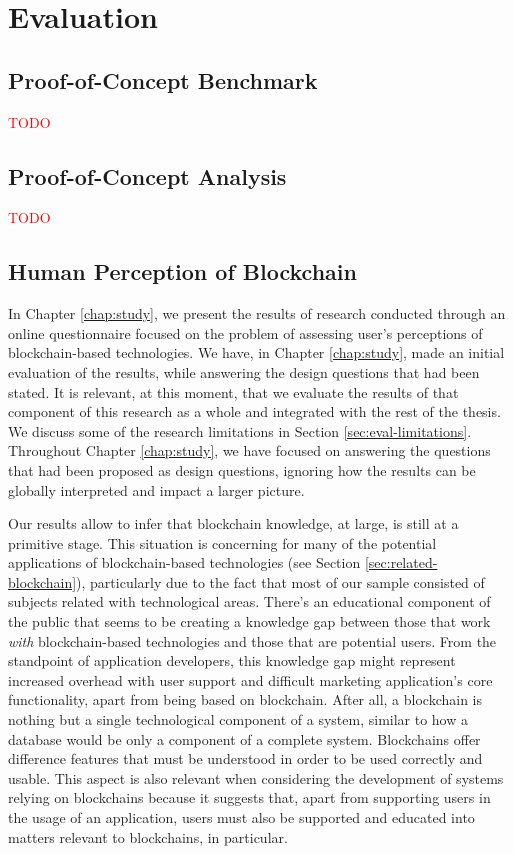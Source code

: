 \chapter{Evaluation}
\label{chap:evaluation}

\section{Proof-of-Concept Benchmark}
\label{sec:eval-benchmark}

\textcolor{red}{TODO}

\section{Proof-of-Concept Analysis} 

\textcolor{red}{TODO}

\section{Human Perception of Blockchain}

In Chapter \ref{chap:study}, we present the results of research conducted through an online questionnaire focused on the problem of assessing user's perceptions of blockchain-based technologies. We have, in Chapter \ref{chap:study}, made an initial evaluation of the results, while answering the design questions that had been stated. It is relevant, at this moment, that we evaluate the results of that component of this research as a whole and integrated with the rest of the thesis. We discuss some of the research limitations in Section \ref{sec:eval-limitations}. Throughout Chapter \ref{chap:study}, we have focused on answering the questions that had been proposed as design questions, ignoring how the results can be globally interpreted and impact a larger picture.

Our results allow to infer that blockchain knowledge, at large, is still at a primitive stage. This situation is concerning for many of the potential applications of blockchain-based technologies (see Section \ref{sec:related-blockchain}), particularly due to the fact that most of our sample consisted of subjects related with technological areas. There's an educational component of the public that seems to be creating a knowledge gap between those that work \emph{with} blockchain-based technologies and those that are potential users. From the standpoint of application developers, this knowledge gap might represent increased overhead with user support and difficult marketing application's core functionality, apart from being based on blockchain. After all, a blockchain is nothing but a single technological component of a system, similar to how a database would be only a component of a complete system. Blockchains offer difference features that must be understood in order to be used correctly and usable. This aspect is also relevant when considering the development of systems relying on blockchains because it suggests that, apart from supporting users in the usage of an application, users must also be supported and educated into matters relevant to blockchains, in particular.

